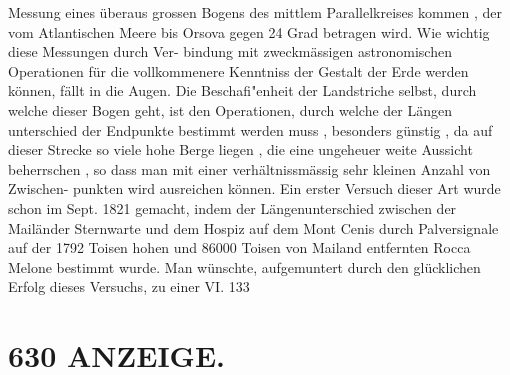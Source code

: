 \documentclass[12pt,a4paper]{article}
\begin{document}
{{{{{{{{Messung  eines  überaus  grossen  Bogens  des  mittlem  Parallelkreises  kommen ,  der  vom Atlantischen  Meere  bis  Orsova  gegen  24  Grad  betragen  wird.  Wie  wichtig  diese  Messungen  durch  Ver- bindung mit  zweckmässigen  astronomischen  Operationen  für  die  vollkommenere  Kenntniss  der  Gestalt der  Erde  werden  können,  fällt  in  die  Augen.  Die  Beschafi"enheit  der  Landstriche  selbst,  durch  welche dieser  Bogen  geht,  ist  den  Operationen,  durch  welche  der  Längen  unterschied  der  Endpunkte  bestimmt werden  muss ,  besonders  günstig ,  da  auf  dieser  Strecke  so  viele  hohe  Berge  liegen ,  die  eine  ungeheuer weite  Aussicht  beherrschen ,  so  dass  man  mit  einer  verhältnissmässig  sehr  kleinen  Anzahl  von  Zwischen- punkten wird  ausreichen  können.  Ein  erster  Versuch  dieser  Art  wurde  schon  im  Sept.  1821  gemacht, indem  der  Längenunterschied  zwischen  der  Mailänder  Sternwarte  und  dem  Hospiz  auf  dem  Mont  Cenis durch  Palversignale  auf  der  1792  Toisen  hohen  und  86000  Toisen  von  Mailand  entfernten  Rocca  Melone bestimmt  wurde.    Man  wünschte,  aufgemuntert  durch  den  glücklichen  Erfolg  dieses  Versuchs,  zu  einer VI.  133


\section*{630  ANZEIGE.}

}}}}}}}}
\end{document}
